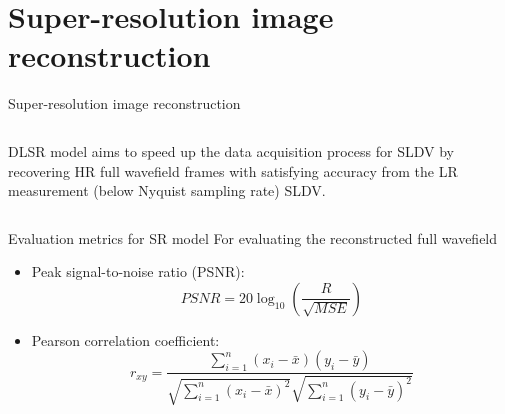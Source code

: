 \documentclass[10pt,aspectratio=169,dvipsnames]{beamer} %
\begin{document}
	\section{Super-resolution image reconstruction}
	\begin{frame}{Super-resolution image reconstruction}
		\begin{columns}[T]
			\begin{column}[c]{0.35\textwidth}
				\justifying	
				\small	
				DLSR model aims to speed up the data acquisition process for SLDV by recovering HR full wavefield frames with satisfying accuracy from the LR measurement (below Nyquist sampling rate) SLDV.
				\bigskip 
			\end{column}
			\begin{column}[c]{0.6\textwidth}
				\begin{figure}
				\end{figure}
			\end{column}
		\end{columns}
	\end{frame}
	\begin{frame}{Evaluation metrics for SR model}
		For evaluating the reconstructed full wavefield
		\begin{itemize}
			\item Peak signal-to-noise ratio (PSNR):
			\begin{equation*}
				PSNR=20\log_{10}\left(\frac{R}{\sqrt{MSE}}\right)
				\label{PSNR}
			\end{equation*}
			\item Pearson correlation coefficient:
			\begin{equation*}
				r_{xy} = \frac{\sum_{i=1}^{n}(x_i - \bar{x})(y_i-\bar{y})}{\sqrt{\sum_{i=1}^{n}(x_i - \bar{x})^2}\sqrt{\sum_{i=1}^{n}(y_i - \bar{y})^2}}
				\label{Pearson}
			\end{equation*}
		\end{itemize}
	\end{frame}
\end{document}
